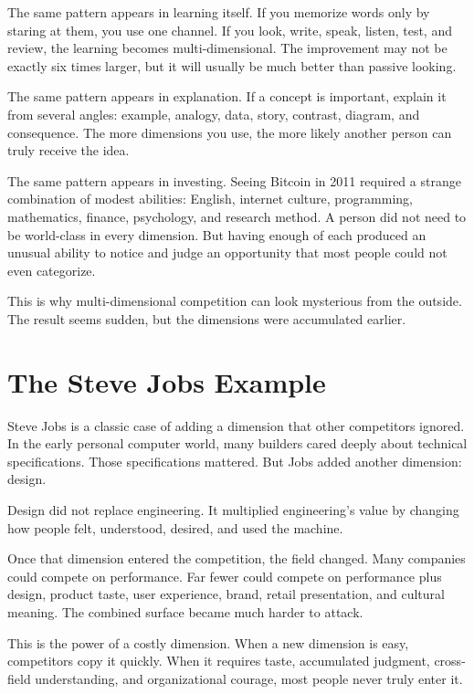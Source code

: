 The same pattern appears in learning itself. If you memorize words only by staring at them, you use one channel. If you look, write, speak, listen, test, and review, the learning becomes multi-dimensional. The improvement may not be exactly six times larger, but it will usually be much better than passive looking.

The same pattern appears in explanation. If a concept is important, explain it from several angles: example, analogy, data, story, contrast, diagram, and consequence. The more dimensions you use, the more likely another person can truly receive the idea.

The same pattern appears in investing. Seeing Bitcoin in 2011 required a strange combination of modest abilities: English, internet culture, programming, mathematics, finance, psychology, and research method. A person did not need to be world-class in every dimension. But having enough of each produced an unusual ability to notice and judge an opportunity that most people could not even categorize.

This is why multi-dimensional competition can look mysterious from the outside. The result seems sudden, but the dimensions were accumulated earlier.

\section*{The Steve Jobs Example}

Steve Jobs is a classic case of adding a dimension that other competitors ignored. In the early personal computer world, many builders cared deeply about technical specifications. Those specifications mattered. But Jobs added another dimension: design.

Design did not replace engineering. It multiplied engineering's value by changing how people felt, understood, desired, and used the machine.

Once that dimension entered the competition, the field changed. Many companies could compete on performance. Far fewer could compete on performance plus design, product taste, user experience, brand, retail presentation, and cultural meaning. The combined surface became much harder to attack.

This is the power of a costly dimension. When a new dimension is easy, competitors copy it quickly. When it requires taste, accumulated judgment, cross-field understanding, and organizational courage, most people never truly enter it.

